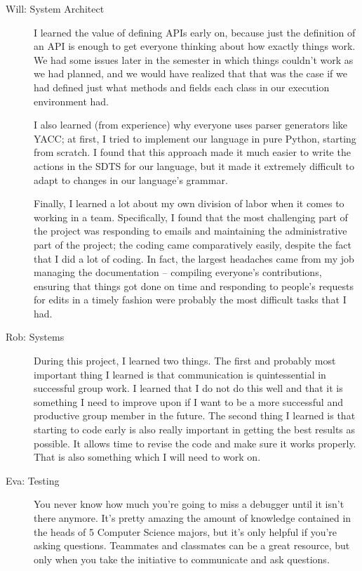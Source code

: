 \begin{description}
\item[Will: System Architect] I learned the value of defining APIs
  early on, because just the definition of an API is enough to get
  everyone thinking about how exactly things work. We had some issues
  later in the semester in which things couldn't work as we had
  planned, and we would have realized that that was the case if we had
  defined just what methods and fields each class in our execution
  environment had.

  I also learned (from experience) why everyone uses parser generators
  like YACC; at first, I tried to implement our language in pure
  Python, starting from scratch. I found that this approach made it
  much easier to write the actions in the SDTS for our language, but
  it made it extremely difficult to adapt to changes in our language's
  grammar.

  Finally, I learned a lot about my own division of labor when it
  comes to working in a team. Specifically, I found that the most
  challenging part of the project was responding to emails and
  maintaining the administrative part of the project; the coding came
  comparatively easily, despite the fact that I did a lot of
  coding. In fact, the largest headaches came from my job managing the
  documentation -- compiling everyone's contributions, ensuring that
  things got done on time and responding to people's requests for
  edits in a timely fashion were probably the most difficult tasks
  that I had.

\item[Rob: Systems] During this project, I learned two things. The
  first and probably most important thing I learned is that
  communication is quintessential in successful group work. I learned
  that I do not do this well and that it is something I need to
  improve upon if I want to be a more successful and productive group
  member in the future. The second thing I learned is that starting to
  code early is also really important in getting the best results as
  possible. It allows time to revise the code and make sure it works
  properly. That is also something which I will need to work on.

\item[Eva: Testing] You never know how much you're going to miss a
  debugger until it isn't there anymore.  It's pretty amazing the
  amount of knowledge contained in the heads of 5 Computer Science
  majors, but it's only helpful if you're asking questions.  Teammates
  and classmates can be a great resource, but only when you take the
  initiative to communicate and ask questions.
\end{description}

